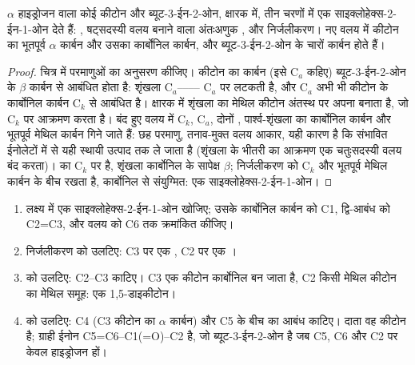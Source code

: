 \begin{proposition}[रॉबिन्सन वलयन]\label{prop:b2:conjugate-additions:robinson}
$\alpha$ हाइड्रोजन वाला कोई कीटोन और ब्यूट-3-ईन-2-ओन, क्षारक में, तीन
चरणों में एक साइक्लोहेक्स-2-ईन-1-ओन देते हैं: , षट्सदस्यी वलय बनाने वाला अंतःअणुक , और निर्जलीकरण।
नए वलय में कीटोन का भूतपूर्व $\alpha$ कार्बन और उसका कार्बोनिल कार्बन, और ब्यूट-3-ईन-2-ओन के चारों
कार्बन होते हैं।
\end{proposition}

\begin{proof}
चित्र में परमाणुओं का अनुसरण कीजिए। कीटोन का  कार्बन (इसे C$_a$ कहिए) ब्यूट-3-ईन-2-ओन के $\beta$
कार्बन से आबंधित होता है: शृंखला C$_a$-------- C$_a$ पर लटकती है, और
C$_a$ अभी भी कीटोन के कार्बोनिल कार्बन C$_k$ से आबंधित है। क्षारक में शृंखला का मेथिल कीटोन
अंतस्थ  पर अपना  बनाता है, जो C$_k$ पर आक्रमण करता है। बंद हुए वलय में C$_k$, C$_a$,
दोनों , पार्श्व-शृंखला का कार्बोनिल कार्बन और भूतपूर्व मेथिल कार्बन गिने जाते हैं: छह परमाणु, तनाव-मुक्त
वलय आकार, यही कारण है कि संभावित ईनोलेटों में से यही  स्थायी उत्पाद तक ले जाता है (शृंखला के
भीतरी   का आक्रमण एक चतुःसदस्यी वलय बंद करता)।  का
 C$_k$ पर है, शृंखला कार्बोनिल के सापेक्ष $\beta$; निर्जलीकरण  को C$_k$ और
भूतपूर्व मेथिल कार्बन के बीच रखता है, कार्बोनिल से संयुग्मित: एक साइक्लोहेक्स-2-ईन-1-ओन।
\end{proof}

\begin{method}[किसी साइक्लोहेक्सीनोन का विच्छेदन]\label{met:b2:conjugate-additions:robinson-disconnection}
\begin{enumerate}
  \item लक्ष्य में एक साइक्लोहेक्स-2-ईन-1-ओन खोजिए; उसके कार्बोनिल कार्बन को C1, द्वि-आबंध को
        C2=C3, और वलय को C6 तक क्रमांकित कीजिए।
  \item निर्जलीकरण को उलटिए: C3 पर एक , C2 पर एक ।
  \item {} को उलटिए: C2--C3 काटिए। C3 एक कीटोन कार्बोनिल बन जाता है, C2 किसी मेथिल कीटोन का
        मेथिल समूह: एक 1,5-डाइकीटोन।
  \item {} को उलटिए: C4 (C3 कीटोन का $\alpha$ कार्बन) और
        C5 के बीच का आबंध काटिए। दाता वह कीटोन है; ग्राही ईनोन C5=C6--C1(=O)--C2 है, जो
        ब्यूट-3-ईन-2-ओन है जब C5, C6 और C2 पर केवल हाइड्रोजन हों।
\end{enumerate}
\end{method}

